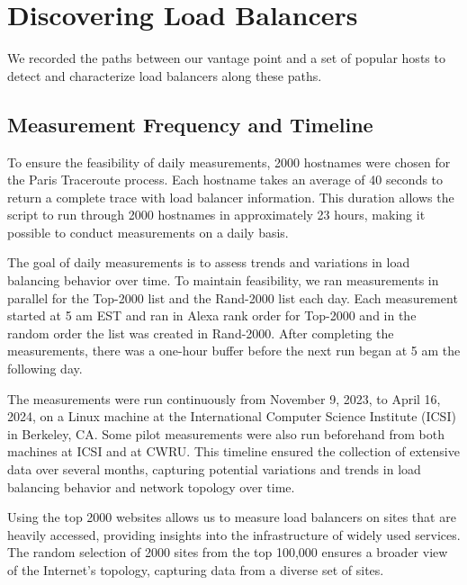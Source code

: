 \documentclass[12pt]{cwru_thesis}
\begin{document}
\section{Discovering Load Balancers}

We recorded the paths between our vantage point and a set of popular hosts to detect and characterize load balancers along these paths. 

\subsection{Measurement Frequency and Timeline}
\label{subsec:freq}


To ensure the feasibility of daily measurements, 2000 hostnames were chosen for the Paris Traceroute process. Each hostname takes an average of 40 seconds to return a complete trace with load balancer information. This duration allows the script to run through 2000 hostnames in approximately 23 hours, making it possible to conduct measurements on a daily basis.

The goal of daily measurements is to assess trends and variations in load balancing behavior over time. To maintain feasibility, we ran measurements in parallel for the Top-2000 list and the Rand-2000 list each day. Each measurement started at 5 am EST and ran in Alexa rank order for Top-2000 and in the random order the list was created in Rand-2000. After completing the measurements, there was a one-hour buffer before the next run began at 5 am the following day.

The measurements were run continuously from November 9, 2023, to April 16, 2024, on a Linux machine at the International Computer Science Institute (ICSI) in Berkeley, CA. Some pilot measurements were also run beforehand from both machines at ICSI and at CWRU.
This timeline ensured the collection of extensive data over several months, capturing potential variations and trends in load balancing behavior and network topology over time. 

Using the top 2000 websites allows us to measure load balancers on sites that are heavily accessed, providing insights into the infrastructure of widely used services. The random selection of 2000 sites from the top 100,000 ensures a broader view of the Internet's topology, capturing data from a diverse set of sites.
\end{document}
